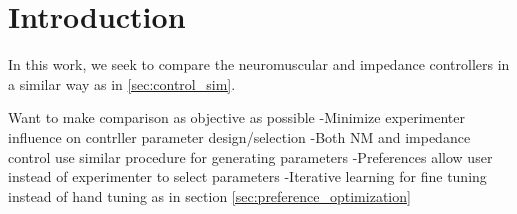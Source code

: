 \section{Introduction}

In this work, we seek to compare the neuromuscular and impedance controllers 
in a similar way as in \cref{sec:control_sim}.

Want to make comparison as objective as possible
    -Minimize experimenter influence on contrller parameter design/selection
    -Both NM and impedance control use similar procedure for generating
    parameters
    -Preferences allow user instead of experimenter to select parameters
    -Iterative learning for fine tuning instead of hand tuning as in section
    \cref{sec:preference_optimization}

